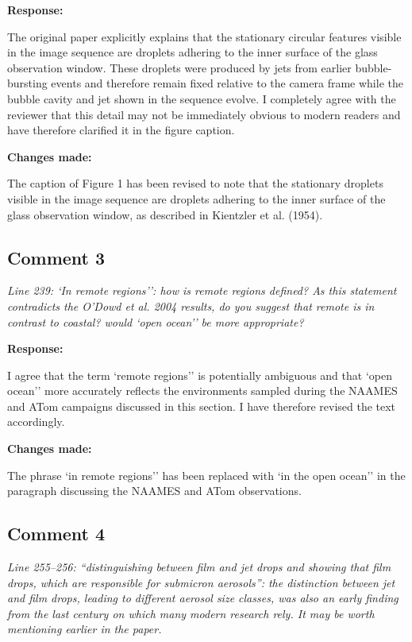 \documentclass[11pt]{article}
\begin{document}
\textbf{Response:}

The original paper explicitly explains that the stationary circular features visible in the image sequence are droplets adhering to the inner surface of the glass observation window. These droplets were produced by jets from earlier bubble-bursting events and therefore remain fixed relative to the camera frame while the bubble cavity and jet shown in the sequence evolve. I completely agree with the reviewer that this detail may not be immediately obvious to modern readers and have therefore clarified it in the figure caption.

\textbf{Changes made:}

The caption of Figure 1 has been revised to note that the stationary droplets visible in the image sequence are droplets adhering to the inner surface of the glass observation window, as described in Kientzler et al. (1954).

\subsection*{Comment 3}

\emph{Line 239: `In remote regions'': how is remote regions defined? As this statement contradicts the O'Dowd et al. 2004 results, do you suggest that remote is in contrast to coastal? would `open ocean'' be more appropriate?}

\textbf{Response:}

I agree that the term `remote regions'' is potentially ambiguous and that `open ocean'' more accurately reflects the environments sampled during the NAAMES and ATom campaigns discussed in this section. I have therefore revised the text accordingly.

\textbf{Changes made:}

The phrase `in remote regions'' has been replaced with `in the open ocean'' in the paragraph discussing the NAAMES and ATom observations.

\subsection*{Comment 4}

\emph{Line 255--256: ``distinguishing between film and jet drops and showing that film drops, which are responsible for submicron aerosols'': the distinction between jet and film drops, leading to different aerosol size classes, was also an early finding from the last century on which many modern research rely. It may be worth mentioning earlier in the paper.}
\end{document}
